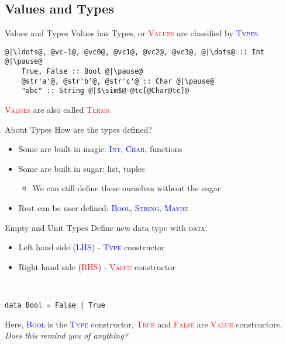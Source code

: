 \documentclass[xcolor={usenames,dvipsnames}]{beamer}
\newcommand{\hkeyword}[1]{\textcolor{TealBlue}{\textsc{#1}}}
\newcommand{\htycon}[1]{\textcolor{Blue}{\textsc{#1}}}
\newcommand{\hvalcon}[1]{\textcolor{Red}{\textsc{#1}}}
\begin{document}
\subsection{Values and Types}

\begin{frame}[fragile]{Values and Types}
  Values has Types, or \hvalcon{Values} are classified by \htycon{Types}.\\

  \begin{lstlisting}[style=hask]
    @|\ldots@, @vc-1@, @vc0@, @vc1@, @vc2@, @vc3@, @|\dots@ :: Int @|\pause@
    True, False :: Bool @|\pause@
    @str'a'@, @str'b'@, @str'c'@ :: Char @|\pause@
    "abc" :: String @|$\sim$@ @tc[@Char@tc]@

  \end{lstlisting}

  \tiny{\hvalcon{Values} are also called \hvalcon{Terms}}
\end{frame}

\begin{frame}[fragile]{About Types}
  How are the types defined?\\
  \begin{itemize}
    \item Some are built in magic: \htycon{Int}, \htycon{Char}, functions
    \pause
    \item Some are built in sugar: list, tuples
      \begin{itemize}
        \item We can still define these ourselves without the sugar
      \end{itemize}
    \pause
    \item Rest can be user defined: \htycon{Bool}, \htycon{String}, \htycon{Maybe}
  \end{itemize}
\end{frame}

\begin{frame}[fragile]{Empty and Unit Types}
  Define new data type with \hkeyword{data}.
  \pause
  \begin{itemize}
    \item Left hand side (\htycon{LHS}) - \htycon{Type} constructor
    \pause
    \item Right hand side (\hvalcon{RHS}) - \hvalcon{Value} constructor
    \pause
  \end{itemize}

  \ \\
  \begin{lstlisting}[style=hask]
    data Bool = False | True
  \end{lstlisting}

  Here, \htycon{Bool} is the \htycon{Type} constructor, \hvalcon{True} and \hvalcon{False} are \hvalcon{Value} constructors.\\
  \textit{\tiny{Does this remind you of anything?}}
\end{frame}
\end{document}
